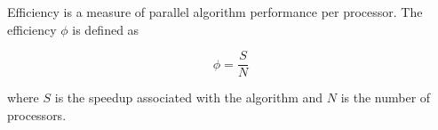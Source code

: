 \documentclass{article}
\begin{document}

Efficiency is a measure of parallel algorithm performance per processor.  The efficiency $\phi$ is defined as

$$ \phi = \frac{S}{N} $$

where $S$ is the speedup associated with the algorithm and $N$ is the number of processors.
\end{document}
